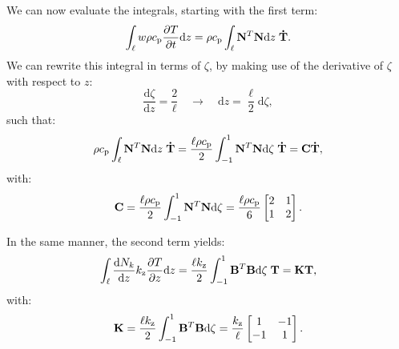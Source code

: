 \documentclass[10pt, a4paper, twoside, headinclude,footinclude, BCOR5mm]{scrartcl}
\begin{document}
We can now evaluate the integrals, starting with the first term:
\begin{equation*}
  \int_\ell w \rho c_\text{p}\frac{\partial T}{\partial t} \text{d}z =
  \rho c_\text{p}\int_\ell \bold{N}^T \bold{N} \text{d}z \; \bold{\dot{T}}.
\end{equation*}
We can rewrite this integral in terms of \(\zeta\), by making use of the derivative of \(\zeta\) with respect to \(z\):
\begin{equation*}
  \frac{\text{d}\zeta}{\text{d}z} = \frac{2}{\ell} \quad\rightarrow\quad
  \text{d}z = \frac{\ell}{2}\text{d}\zeta,
\end{equation*}
such that:
\begin{equation}
\label{eq:C}
  \rho c_\text{p} \int_\ell \bold{N}^T \bold{N}\text{d}z \;\bold{\dot{T}} =
  \frac{\ell\rho c_\text{p}}{2}\int_{-1}^{1} \bold{N}^T \bold{N} \text{d}\zeta \; \bold{\dot{T}} =
  \bold{C}\bold{\dot{T}},
\end{equation}
with:
\begin{equation*}
  \bold{C} = \frac{\ell\rho c_\text{p}}{2}\int_{-1}^{1} \bold{N}^T\bold{N} \text{d}\zeta =
  \frac{\ell\rho c_\text{p}}{6}\left[\begin{matrix} 2 & 1\\
                                               1 & 2\end{matrix}\right].
\end{equation*}

In the same manner, the second term yields:
\begin{equation}
\label{eq:K}
  \int_\ell \frac{\text{d}N_k}{\text{d}z}k_\text{z}\frac{\partial T}{\partial z}\text{d}z =
  \frac{\ell k_\text{z}}{2} \int_{-1}^{1} \bold{B}^T \bold{B} \text{d}\zeta \;\bold{T} = \bold{K} \bold{T},
\end{equation}
with:
\begin{equation*}
  \bold{K} = \frac{\ell k_\text{z}}{2} \int_{-1}^{1} \bold{B}^T \bold{B} \text{d}\zeta =
  \frac{k_\text{z}}{\ell}\left[\begin{matrix} 1 & -1\\
                                              -1 & 1\end{matrix}\right].
\end{equation*}
\end{document}
